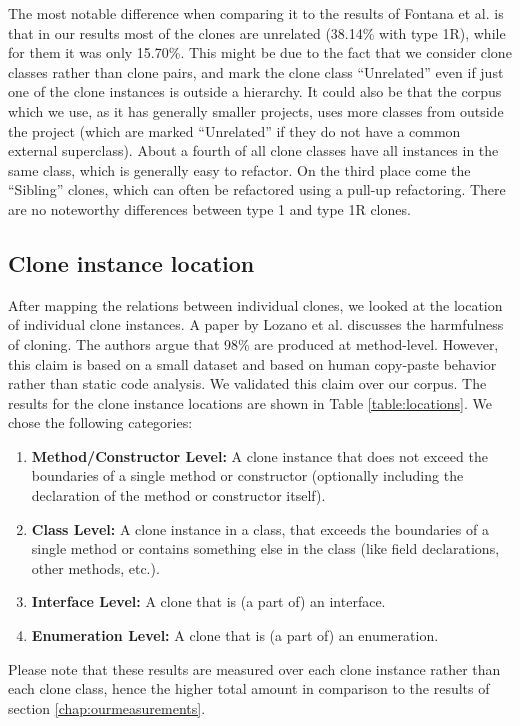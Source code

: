 \documentclass[a4paper]{article}
\begin{document}
The most notable difference when comparing it to the results of Fontana et al. \cite{fontana2015duplicated} is that in our results most of the clones are unrelated (38.14\% with type 1R), while for them it was only 15.70\%. This might be due to the fact that we consider clone classes rather than clone pairs, and mark the clone class ``Unrelated'' even if just one of the clone instances is outside a hierarchy. It could also be that the corpus which we use, as it has generally smaller projects, uses more classes from outside the project (which are marked ``Unrelated'' if they do not have a common external superclass). About a fourth of all clone classes have all instances in the same class, which is generally easy to refactor. On the third place come the ``Sibling'' clones, which can often be refactored using a pull-up refactoring. There are no noteworthy differences between type 1 and type 1R clones.

\subsection{Clone instance location}\label{chap:clonelocation}
After mapping the relations between individual clones, we looked at the location of individual clone instances. A paper by Lozano et al. \cite{lozano2007evaluating} discusses the harmfulness of cloning. The authors argue that 98\% are produced at method-level. However, this claim is based on a small dataset and based on human copy-paste behavior rather than static code analysis. We validated this claim over our corpus. The results for the clone instance locations are shown in Table \ref{table:locations}. We chose the following categories:
\begin{enumerate}
  \item \textbf{Method/Constructor Level:} A clone instance that does not exceed the boundaries of a single method or constructor (optionally including the declaration of the method or constructor itself).
  \item \textbf{Class Level:} A clone instance in a class, that exceeds the boundaries of a single method or contains something else in the class (like field declarations, other methods, etc.).
  \item \textbf{Interface Level:} A clone that is (a part of) an interface.
  \item \textbf{Enumeration Level:} A clone that is (a part of) an enumeration.
\end{enumerate}

Please note that these results are measured over each clone instance rather than each clone class, hence the higher total amount in comparison to the results of section \ref{chap:ourmeasurements}.
\end{document}
